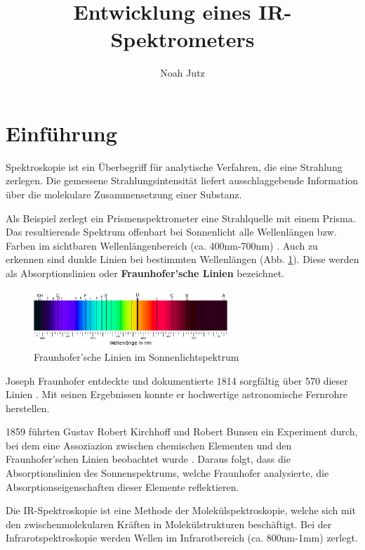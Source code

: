 \documentclass{article}
\title{Entwicklung eines IR-Spektrometers}
\author{Noah Jutz}
\date{}
\begin{document}
\maketitle
\tableofcontents

\newpage
\section{Einführung}
Spektroskopie ist ein Überbegriff für analytische Verfahren, die eine Strahlung zerlegen. Die gemessene Strahlungsintensität liefert ausschlaggebende Information über die molekulare Zusammensetzung einer Substanz.

Als Beispiel zerlegt ein Prismenspektrometer eine Strahlquelle mit einem Prisma. Das resultierende Spektrum offenbart bei Sonnenlicht alle Wellenlängen bzw. Farben im sichtbaren Wellenlängenbereich (ca. 400nm-700nm) \cite{TODO}. Auch zu erkennen sind dunkle Linien bei bestimmten Wellenlängen (Abb. \ref{fig:fraunhofer-linien}). Diese werden als Absorptionslinien oder \textbf{Fraunhofer'sche Linien} bezeichnet.

\begin{figure}[ht]
    \centering
    \includegraphics[width=0.65\textwidth]{fraunhofer_linien.png}
    \caption{Fraunhofer'sche Linien im Sonnenlichtspektrum \cite{TODO}}
    \label{fig:fraunhofer-linien}
\end{figure}

Joseph Fraunhofer entdeckte und dokumentierte 1814 sorgfältig über 570 dieser Linien \cite{TODO}. Mit seinen Ergebnissen konnte er hochwertige astronomische Fernrohre herstellen.

1859 führten Gustav Robert Kirchhoff und Robert Bunsen ein Experiment durch, bei dem eine Assoziazion zwischen chemischen Elementen und den Fraunhofer'schen Linien beobachtet wurde \cite{TODO}. Daraus folgt, dass die Absorptionslinien des Sonnenspektrums, welche Fraunhofer analysierte, die Absorptionseigenschaften dieser Elemente reflektieren.

Die IR-Spektroskopie ist eine Methode der Molekülspektroskopie, welche sich mit den zwischenmolekularen Kräften in Molekülstrukturen beschäftigt. Bei der Infrarotspektroskopie werden Wellen im Infrarotbereich (ca. 800nm-1mm) \cite{TODO} zerlegt.
\end{document}
